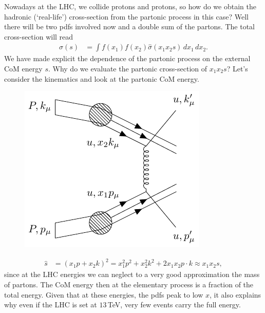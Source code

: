 \documentclass[a4paper, 11pt, normalem]{report}
\begin{document}
Nowadays at the LHC, we collide protons and protons, so how do we obtain the hadronic (`real-life') cross-section from the partonic process in this case?
Well there will be two pdfs involved now and a double sum of the partons.
The total cross-section will read
\begin{align}
    \sigma(s) &= \int f(x_1)f(x_2)\hat{\sigma}(x_1x_2s)\,dx_1\,dx_2.
\end{align}
We have made explicit the dependence of the partonic process on the external CoM energy $s$.
Why do we evaluate the partonic cross-section of $x_1x_2s$?
Let's consider the kinematics and look at the partonic CoM energy.
\begin{figure}[H]
    \centering
    \includegraphics[scale=1.3]{propro.pdf}
    \vspace{-30pt}
\end{figure}
\begin{align}
    \hat{s} &= (x_1p+x_2k)^2 = x_1^2p^2 + x_2^2k^2 + 2x_1x_2p\cdot k \approx x_1x_2s,
\end{align}
since at the LHC energies we can neglect to a very good approximation the mass of partons.
The CoM energy then at the elementary process is a fraction of the total energy.
Given that at these energies, the pdfs peak to low $x$, it also explains why even if the LHC is set at $13\,$TeV, very few events carry the full energy.
\end{document}
